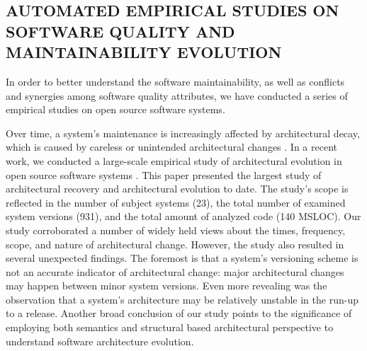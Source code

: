 \subsection{AUTOMATED EMPIRICAL STUDIES ON SOFTWARE QUALITY AND MAINTAINABILITY EVOLUTION}
In order to better understand the software maintainability, as well as conflicts and synergies among software quality attributes, we have conducted a series of empirical studies on open source software systems.


Over time, a system's maintenance is increasingly affected by architectural decay, which is caused by careless or unintended architectural changes \cite{medvidovic2010software}.
In a recent work, we conducted a large-scale empirical study of architectural evolution in open source software systems \cite{Behnamghader2017}. This paper presented the largest study of architectural recovery and architectural evolution to date. The study's scope is reflected in the number of subject systems (23), the total number of examined system versions (931), and the total amount of analyzed code (140 MSLOC). Our study corroborated a number of widely held views about the times, frequency, scope, and nature of architectural change. However, the study also resulted in several unexpected findings. The foremost is that a system's versioning scheme is not an accurate indicator of architectural change: major architectural changes may happen between minor system versions. Even more revealing was the observation that a system's architecture may be relatively unstable in the run-up to a release. Another broad conclusion of our study points to the significance  of employing both semantics and structural based architectural perspective to understand software architecture evolution.

